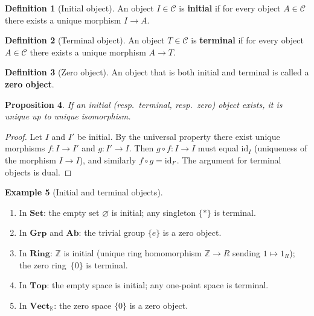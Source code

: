 \documentclass[a4paper,12pt]{book}
\newcommand{\Set}{\mathbf{Set}}
\newcommand{\Grp}{\mathbf{Grp}}
\newcommand{\Ab}{\mathbf{Ab}}
\newcommand{\Ring}{\mathbf{Ring}}
\newcommand{\Top}{\mathbf{Top}}
\newcommand{\Vect}{\mathbf{Vect}}
\newcommand{\id}{\mathrm{id}}
\newcommand{\Z}{\mathbb{Z}}
\newcommand{\K}{\mathbb{K}}
\theoremstyle{definition}
\newtheorem{definition}{Definition}[section]
\newtheorem{example}[definition]{Example}
\theoremstyle{plain}
\newtheorem{proposition}[definition]{Proposition}
\theoremstyle{remark}
\begin{document}
\begin{definition}[Initial object]\label{def:initial}
An object $I\in\mathcal{C}$ is \textbf{initial} if for every object
$A\in\mathcal{C}$ there exists a unique morphism $I\to A$.
\end{definition}

\begin{definition}[Terminal object]\label{def:terminal}
An object $T\in\mathcal{C}$ is \textbf{terminal} if for every object
$A\in\mathcal{C}$ there exists a unique morphism $A\to T$.
\end{definition}

\begin{definition}[Zero object]\label{def:zero-object}
An object that is both initial and terminal is called a
\textbf{zero object}.
\end{definition}

\begin{proposition}\label{prop:initial-terminal-unique}
If an initial (resp.\ terminal, resp.\ zero) object exists, it is unique
up to unique isomorphism.
\end{proposition}

\begin{proof}
Let $I$ and $I'$ be initial.  By the universal property there exist
unique morphisms $f\colon I\to I'$ and $g\colon I'\to I$.
Then $g\circ f\colon I\to I$ must equal $\id_I$ (uniqueness of the
morphism $I\to I$), and similarly $f\circ g = \id_{I'}$.
The argument for terminal objects is dual.
\end{proof}

\begin{example}[Initial and terminal objects]\label{ex:initial-terminal}
\begin{enumerate}[label=(\roman*)]
    \item In $\Set$: the empty set $\varnothing$ is initial; any
          singleton $\{*\}$ is terminal.
    \item In $\Grp$ and $\Ab$: the trivial group $\{e\}$ is a
          zero object.
    \item In $\Ring$: $\Z$ is initial (unique ring homomorphism
          $\Z\to R$ sending $1\mapsto 1_R$); the zero ring~$\{0\}$
          is terminal.
    \item In $\Top$: the empty space is initial; any one-point space
          is terminal.
    \item In $\Vect_\K$: the zero space $\{0\}$ is a zero object.
\end{enumerate}
\end{example}
\end{document}
